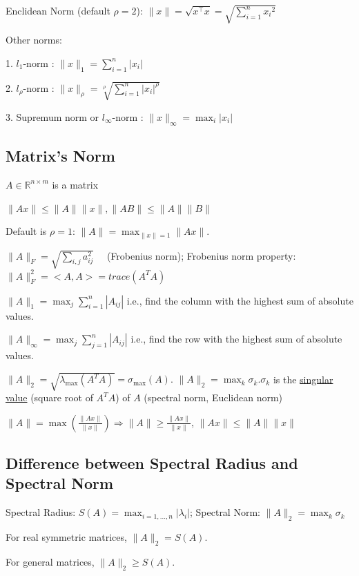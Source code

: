 \documentclass[11pt]{elegantbook}
\begin{document}
Enclidean Norm (default $\rho=2$): $\|x\|=\sqrt{x^{\top} x}=\sqrt{\sum_{i=1}^{n} x_{i}{ }^{2}}$

Other norms:

1. $l_{1}$-norm : $\|x\|_{1}=\sum_{i=1}^{n}\left|x_{i}\right|$

2. $l_{\rho}$-norm : $\|x\|_{\rho}=\sqrt[\rho]{\sum_{i=1}^{n}\left|x_{i}\right|^\rho}$

3. Supremum norm or $l_{\infty}$-norm : $\|x\|_{\infty}=\max _{i}\left|x_{i}\right|$

\subsection{Matrix's Norm}
$A\in \mathbb{R}^{n\times m}$ is a matrix

$\|A x\| \leqslant\|A\|\|x\|,\|A B\| \leqslant\|A\|\|B\|$

Default is $\rho=1$: $\|A\|=\max _{\|x\|=1}\|A x\|$.

$\|A\|_{F}=\sqrt{\sum_{i, j} a_{i j}^{2}} \quad$ (Frobenius norm);  Frobenius norm property: $\|A\|_F^2=<A,A>=trace(A^TA)$

$\|A\|_{1}=\max _{j} \sum_{i=1}^{n}\left|A_{i j}\right|$ i.e., find the column with the highest sum of absolute values.

$\|A\|_{\infty}=\max _{j} \sum_{j=1}^{n}\left|A_{i j}\right|$ i.e., find the row with the highest sum of absolute values.

${\displaystyle \|A\|_{2}={\sqrt {\lambda _{\max }\left(A^{T}A\right)}}=\sigma _{\max }(A).}$
$\|A\|_{2}=\max _{k} \sigma_{k}. \sigma_{k}$ is the \underline{singular value} (square root of $A^TA$) of $A$ (spectral norm, Euclidean norm)

$\|A\|=\max \left(\frac{\|A x\|}{\|x\|}\right) \Rightarrow\|A\| \geqslant \frac{\|A x\|}{\|x\|}$, $\|Ax\| \leqslant\|A\|\|x\|$

\subsection{Difference between Spectral Radius and Spectral Norm}
Spectral Radius: $S(A)=\max_{i=1,...,n}|\lambda_i|$; Spectral Norm: $\|A\|_{2}=\max _{k} \sigma_{k}$

For real symmetric matrices, $\|A\|_2=S(A)$.

For general matrices, $\|A\|_2\geq S(A)$.
\end{document}
